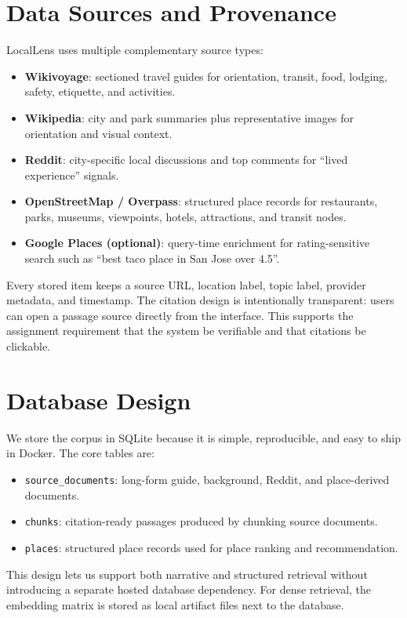 \documentclass[11pt]{article}
\begin{document}
\section{Data Sources and Provenance}
LocalLens uses multiple complementary source types:
\begin{itemize}[leftmargin=*]
    \item \textbf{Wikivoyage}: sectioned travel guides for orientation, transit, food, lodging, safety, etiquette, and activities.
    \item \textbf{Wikipedia}: city and park summaries plus representative images for orientation and visual context.
    \item \textbf{Reddit}: city-specific local discussions and top comments for ``lived experience'' signals.
    \item \textbf{OpenStreetMap / Overpass}: structured place records for restaurants, parks, museums, viewpoints, hotels, attractions, and transit nodes.
    \item \textbf{Google Places (optional)}: query-time enrichment for rating-sensitive search such as ``best taco place in San Jose over 4.5''.
\end{itemize}

Every stored item keeps a source URL, location label, topic label, provider metadata, and timestamp. The citation design is intentionally transparent: users can open a passage source directly from the interface. This supports the assignment requirement that the system be verifiable and that citations be clickable.

\section{Database Design}
We store the corpus in SQLite because it is simple, reproducible, and easy to ship in Docker. The core tables are:
\begin{itemize}[leftmargin=*]
    \item \texttt{source\_documents}: long-form guide, background, Reddit, and place-derived documents.
    \item \texttt{chunks}: citation-ready passages produced by chunking source documents.
    \item \texttt{places}: structured place records used for place ranking and recommendation.
\end{itemize}

This design lets us support both narrative and structured retrieval without introducing a separate hosted database dependency. For dense retrieval, the embedding matrix is stored as local artifact files next to the database.
\end{document}
